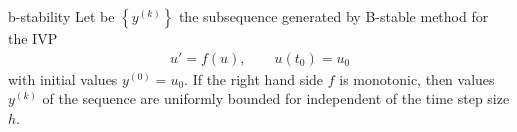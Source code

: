 \begin{Theorem}{b-stability}
  Let be $\left\{y^{(k)}\right\}$ the subsequence generated by
  B-stable method for the IVP
  \begin{gather*}
    u'=f(u), \qquad u(t_0) = u_0
  \end{gather*}
  with initial values $y^{(0)} = u_0$. If the right hand side $f$ is
  monotonic, then values $y^{(k)}$ of the sequence are uniformly
  bounded for independent of the time step size $h$.
\end{Theorem}
